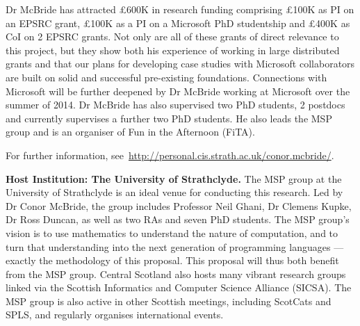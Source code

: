 \documentclass[a4paper,11pt]{article}
\begin{document}
Dr McBride has attracted \pounds 600K in research funding comprising
\pounds 100K as PI on an EPSRC grant, \pounds 100K as a PI on a
Microsoft PhD studentship and \pounds 400K as CoI on 2 EPSRC
grants. Not only are all of these grants of direct relevance to this
project, but they show both his experience of working in large
distributed grants and that our plans for developing case studies with
Microsoft collaborators are built on solid and successful pre-existing
foundations. Connections with Microsoft will be further deepened by Dr
McBride working at Microsoft over the summer of 2014.  Dr McBride has
also supervised two PhD students, 2 postdocs and currently supervises
a further two PhD students. He also leads the MSP group and is an
organiser of Fun in the Afternoon (FiTA).

For further information,
see~\url{http://personal.cis.strath.ac.uk/conor.mcbride/}.

\textbf{Host Institution: The University of Strathclyde.} The MSP
group at the University of Strathclyde is an ideal venue for
conducting this research. Led by Dr Conor McBride, the group includes
Professor Neil Ghani, Dr Clemens Kupke, Dr Ross Duncan, as well as two
RAs and seven PhD students. The MSP group's vision is to use
mathematics to understand the nature of computation, and to turn that
understanding into the next generation of programming languages ---
exactly the methodology of this proposal. This proposal will thus both
benefit from the MSP group. Central Scotland also hosts many vibrant
research groups linked via the Scottish Informatics and Computer
Science Alliance (SICSA). The MSP group is also active in other
Scottish meetings, including ScotCats and SPLS, and regularly
organises international events.
\end{document}
